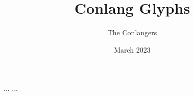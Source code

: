 \documentclass{article}
\title{Conlang Glyphs}
\author{The Conlangers}
\date{March 2023}
\begin{document}
\maketitle
\def\thickness{15pt}

\thispagestyle{empty}



%




\DeclareLetter{\LV}{\CH}
\DeclareLetter{\LV}{\TopHorizontal}
\DeclareLetter{\RightVertical}{\TopHorizontal}
\DeclareLetter{\BottomHorizontal}{\CenterVertical}
\DeclareLetter{\BottomHorizontal}{\RightVertical}
\DeclareLetter{\BottomHorizontal}{\RightVertical}
\DeclareLetter{\BottomHorizontal}{\LeftVertical}
\DeclareLetter{\LeftVertical}{\CenterHorizontal}
\DeclareLetter{\RightVertical}{\CenterHorizontal}
\DeclareLetter{\CenterVertical}{\CenterHorizontal}


\DeclareLetter{\RightCenterDiagonal}{\TopHorizontal}
\DeclareLetter{\RightCenterDiagonal}{\LeftTopHorizontal}
\DeclareLetter{\RightCenterDiagonal}{\LeftCenterHorizontal}
\DeclareLetter{\RightCenterDiagonal}{\LeftBottomHorizontal}
\DeclareLetter{\RightCenterDiagonal}{\BottomHorizontal}
\DeclareLetter{\RightCenterDiagonal}{\RightCenterHorizontal}
\DeclareLetter{\RightCenterDiagonal}{\RightTopHorizontal}
\DeclareLetter{\RightCenterDiagonal}{\CenterHorizontal}


\DeclareLetter{\LeftCenterDiagonal}{\TopHorizontal}
\DeclareLetter{\LeftCenterDiagonal}{\RightTopHorizontal}
\DeclareLetter{\LeftCenterDiagonal}{\RightCenterHorizontal}
\DeclareLetter{\LeftCenterDiagonal}{\RightBottomHorizontal}
\DeclareLetter{\LeftCenterDiagonal}{\BottomHorizontal}
\DeclareLetter{\LeftCenterDiagonal}{\LeftCenterHorizontal}
\DeclareLetter{\LeftCenterDiagonal}{\LeftTopHorizontal}
\DeclareLetter{\LeftCenterDiagonal}{\CenterHorizontal}

\DeclareLetter{\ArchBottomRight}{\UpperHorizontal}
\DeclareLetter{\ArchBottomRight}{\QRightUpperHorizontal}
\DeclareLetter{\ArchBottomRight}{\LeftLowerHorizontal}
\DeclareLetter{\ArchBottomRight}{\RightLeftBottomHorizontal}
\DeclareLetter{\ArchBottomRight}{\BottomHorizontal}
\DeclareLetter{\ArchBottomRight}{\LeftRightBottomHorizontal}
\DeclareLetter{\ArchBottomRight}{\LeftLowerHorizontal}
\DeclareLetter{\ArchBottomRight}{\OuterRightUpperHorizontal}
\DeclareLetter{\ArchBottomRight}{\CenterHorizontal}
...
...
\end{document}
